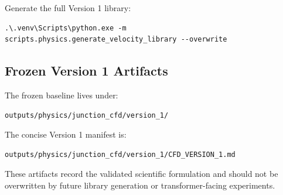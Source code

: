 Generate the full Version 1 library:

\begin{verbatim}
.\.venv\Scripts\python.exe -m scripts.physics.generate_velocity_library --overwrite
\end{verbatim}

\subsection{Frozen Version 1 Artifacts}

The frozen baseline lives under:

\begin{verbatim}
outputs/physics/junction_cfd/version_1/
\end{verbatim}

The concise Version 1 manifest is:

\begin{verbatim}
outputs/physics/junction_cfd/version_1/CFD_VERSION_1.md
\end{verbatim}

These artifacts record the validated scientific formulation and should not be
overwritten by future library generation or transformer-facing experiments.
